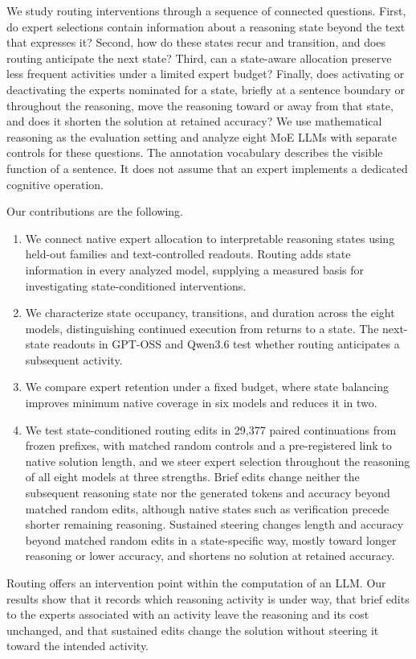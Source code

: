 We study routing interventions through a sequence of connected questions.
%
First, do expert selections contain information about a reasoning state beyond the text that expresses it?
%
Second, how do these states recur and transition, and does routing anticipate the next state?
%
Third, can a state-aware allocation preserve less frequent activities under a limited expert budget?
%
Finally, does activating or deactivating the experts nominated for a state, briefly at a sentence boundary or throughout the reasoning, move the reasoning toward or away from that state, and does it shorten the solution at retained accuracy?
%
We use mathematical reasoning as the evaluation setting and analyze eight MoE LLMs with separate controls for these questions.
%
The annotation vocabulary describes the visible function of a sentence.
%
It does not assume that an expert implements a dedicated cognitive operation.
%

Our contributions are the following.
%
\begin{enumerate}
\renewcommand{\labelenumi}{\circnum{\arabic{enumi}}}
\item We connect native expert allocation to interpretable reasoning states using held-out families and text-controlled readouts.
%
Routing adds state information in every analyzed model, supplying a measured basis for investigating state-conditioned interventions.
%
\item We characterize state occupancy, transitions, and duration across the eight models, distinguishing continued execution from returns to a state.
%
The next-state readouts in GPT-OSS and Qwen3.6 test whether routing anticipates a subsequent activity.
%
\item We compare expert retention under a fixed budget, where state balancing improves minimum native coverage in six models and reduces it in two.
%
\item We test state-conditioned routing edits in 29,377 paired continuations from frozen prefixes, with matched random controls and a pre-registered link to native solution length, and we steer expert selection throughout the reasoning of all eight models at three strengths.
%
Brief edits change neither the subsequent reasoning state nor the generated tokens and accuracy beyond matched random edits, although native states such as verification precede shorter remaining reasoning.
%
Sustained steering changes length and accuracy beyond matched random edits in a state-specific way, mostly toward longer reasoning or lower accuracy, and shortens no solution at retained accuracy.
%
\end{enumerate}

Routing offers an intervention point within the computation of an LLM.
%
Our results show that it records which reasoning activity is under way, that brief edits to the experts associated with an activity leave the reasoning and its cost unchanged, and that sustained edits change the solution without steering it toward the intended activity.
%
